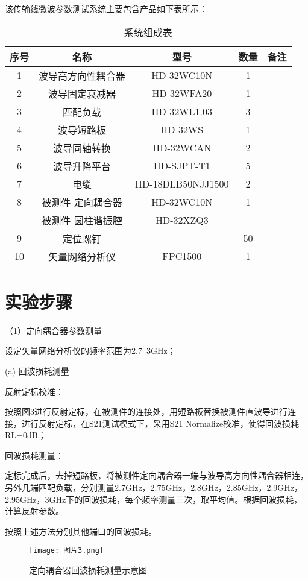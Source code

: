 \documentclass[UTF8]{ctexart}
\begin{document}
该传输线微波参数测试系统主要包含产品如下表所示：
\begin{table}[!htp]
    \centering
    \caption{系统组成表}
    \begin{tabular}{|c| c |c| c| c|}
        \hline
        序号 & 名称 & 型号 & 数量 & 备注 \\
        \hline
        1 & 波导高方向性耦合器 & HD-32WC10N & 1 & \\\hline
        2 & 波导固定衰减器 & HD-32WFA20 & 1 & \\\hline
        3 & 匹配负载 & HD-32WL1.03 & 3 & \\\hline
        4 & 波导短路板 & HD-32WS & 1 & \\\hline
        5 & 波导同轴转换 & HD-32WCAN & 2 & \\\hline
        6 & 波导升降平台 & HD-SJPT-T1 & 5 & \\\hline
        7 & 电缆 & HD-18DLB50NJJ1500 & 2 & \\\hline
        8 & 被测件 定向耦合器& HD-32WC10N& 1&\\\hline
        & 被测件 圆柱谐振腔& HD-32XZQ3&&\\\hline
        9& 定位螺钉&&50&\\\hline
        10& 矢量网络分析仪&FPC1500&1&\\
        \hline
        \end{tabular}
\end{table}
\section{实验步骤}
（1）定向耦合器参数测量

设定矢量网络分析仪的频率范围为2.7~3GHz；

(a) 回波损耗测量

反射定标校准：

按照图3进行反射定标，在被测件的连接处，用短路板替换被测件直波导进行连接，进行反射定标，在S21测试模式下，采用S21 Normalize校准，使得回波损耗RL=0dB；

回波损耗测量：

定标完成后，去掉短路板，将被测件定向耦合器一端与波导高方向性耦合器相连，另外几端匹配负载，分别测量2.7GHz，2.75GHz，2.8GHz，2.85GHz，2.9GHz，2.95GHz，3GHz下的回波损耗，每个频率测量三次，取平均值。根据回波损耗，计算反射参数。

按照上述方法分别其他端口的回波损耗。
\begin{figure}[!htp]
    \centering
    \texttt{[image: 图片3.png]}
    \caption{定向耦合器回波损耗测量示意图}
\end{figure}
\end{document}
